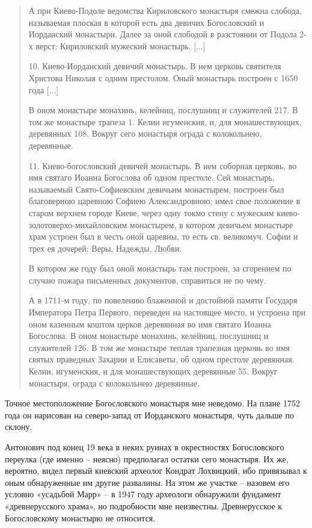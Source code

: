 \begin{quotation}
А при Киево-Подоле ведомства Кириловского монастыря смежна слобода, называемая плоская в которой есть два девичих Богословский и Иорданский монастыри. Далее за оной слободой в разстоянии от Подола 2-х верст: Кириловский мужеский монастырь. [...]

10. Киево-Иорданский девичий монастырь. В нем церковь святителя Христова Николая с одним престолом. Оный монастырь построен с 1650 года [...] 

В оном монастыре монахинь, келейниц, послушниц и служителей 217. В том же монастыре трапеза 1. Келии игуменския, и, для монашествующих, деревянных 108. Вокруг сего монастыря ограда с колокольнею, деревянные.

11. Киево-богословский девичей монастырь. В нем соборная церковь, во имя святаго Иоанна Богослова об одном престоле. Сей монастырь, называемый Свято-Софиевским девичьим монастырем, построен был благоверною царевною Софиею Александровною; имел свое положение в старом верхнем городе Киеве, через одну токмо стену с мужеским киево-золото\-верхо-михайловским монастырем, в котором девичьем монастыре храм устроен был в честь оной царевны, то есть св. великомуч. Софии и трех ея дочерей: Веры, Надежды, Любви. 

В котором же году был оной монастырь там построен, за сгорением по случаю пожара письменных документов, справиться не по чему. 

А в 1711-м году, по повелению блаженной и достойной памяти Государя Императора Петра Первого, переведен на настоящее место, и устроена при оном казенным коштом церков деревянная во имя святаго Иоанна Богослова. В оном монастыре монахинь, келейниц, послушниц и служителей 126. В том же монастыре теплая трапезная церковь во имя святых праведных Захарии и Елисаветы, об одном престоле деревянная. Келии, игуменския, и для монашествующих деревянные 55. Вокруг монастыря, ограда с колокольнею деревянные.
\end{quotation}

Точное местоположение Богословского монастыря мне неведомо. На плане 1752 года он нарисован на северо-запад от Иорданского монастыря, чуть дальше по склону.

Антонович под конец 19 века в неких руинах в окрестностях Богословского переулка (где именно – неясно) предполагал остатки сего монастыря. Их же, вероятно, видел первый киевский археолог Кондрат Лохвицкий, ибо привязывал к оным обнаруженные им другие развалины. На этом же участке – назовем его условно «усадьбой Марр» – в 1947 году археологи обнаружили фундамент «древнерусского храма», но подробности мне неизвестны. Древнерусское к Богословскому монастырю не относится.

